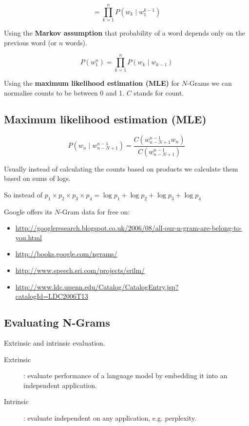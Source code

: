\begin{equation}
  = \prod_{k=1}^{n}P(w_k \mid w_1^{k-1})
\end{equation}

Using the \textbf{Markov assumption} that probability of a word depends only on the previous word (or $n$ words).

\begin{equation}
  P(w_1^n) = \prod_{k=1}^{n}P(w_k \mid w_{k-1})
\end{equation}

Using the \textbf{maximum likelihood estimation (MLE)} for $N$-Grams we can normalise counts to be between 0 and 1. $C$ stands for count.

\subsection*{Maximum likelihood estimation (MLE)}

\begin{equation}
  P(w_n \mid w_{n-N+1}^{n-1}) = \frac{C(w_{n-N+1}^{n-1} w_n)}{C(w_{n-N+1}^{n-1})}
\end{equation}

Usually instead of calculating the counts based on products we calculate them based on sums of logs.

So instead of  $p_1 \times p_2 \times p_3 \times p_4 = \log p_1 + \log p_2 + \log p_3 + \log p_4$

Google offers its $N$-Gram data for free on:

\begin{itemize}
  \item \url{http://googleresearch.blogspot.co.uk/2006/08/all-our-n-gram-are-belong-to-you.html}
  \item \url{http://books.google.com/ngrams/}
  \item	\url{http://www.speech.sri.com/projects/srilm/}
  \item	\url{http://www.ldc.upenn.edu/Catalog/CatalogEntry.jsp?catalogId=LDC2006T13}
\end{itemize}

\subsection*{Evaluating N-Grams}

Extrinsic and intrinsic evaluation.

\begin{description}
  \item [Extrinsic]: evaluate performance of a language model by embedding it into an independent application.
  \item [Intrinsic]: evaluate independent on any application, e.g. perplexity.
\end{description}

